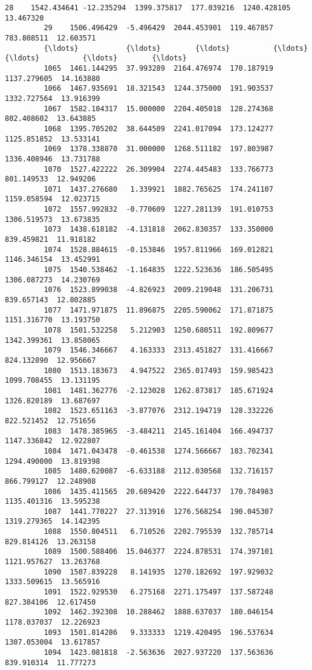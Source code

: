 \documentclass[11pt]{article}
\begin{document}
\begin{Verbatim}[commandchars=\\\{\}]
         28    1542.434641 -12.235294  1399.375817  177.039216  1240.428105  13.467320   
         29    1506.496429  -5.496429  2044.453901  119.467857   783.808511  12.603571   
         {\ldots}           {\ldots}        {\ldots}          {\ldots}         {\ldots}          {\ldots}        {\ldots}   
         1065  1461.144295  37.993289  2164.476974  170.187919  1137.279605  14.163880   
         1066  1467.935691  18.321543  1244.375000  191.903537  1332.727564  13.916399   
         1067  1582.104317  15.000000  2204.405018  128.274368   802.408602  13.643885   
         1068  1395.705202  38.644509  2241.017094  173.124277  1125.851852  13.533141   
         1069  1378.338870  31.000000  1268.511182  197.803987  1336.408946  13.731788   
         1070  1527.422222  26.309904  2274.445483  133.766773   801.149533  12.949206   
         1071  1437.276680   1.339921  1882.765625  174.241107  1159.058594  12.023715   
         1072  1557.992832  -0.770609  1227.281139  191.010753  1306.519573  13.673835   
         1073  1438.618182  -4.131818  2062.830357  133.350000   839.459821  11.918182   
         1074  1528.884615  -0.153846  1957.811966  169.012821  1146.346154  13.452991   
         1075  1540.538462  -1.164835  1222.523636  186.505495  1306.087273  14.230769   
         1076  1523.899038  -4.826923  2009.219048  131.206731   839.657143  12.802885   
         1077  1471.971875  11.896875  2205.590062  171.871875  1151.316770  13.193750   
         1078  1501.532258   5.212903  1250.680511  192.809677  1342.399361  13.858065   
         1079  1546.346667   4.163333  2313.451827  131.416667   824.132890  12.956667   
         1080  1513.183673   4.947522  2365.017493  159.985423  1099.708455  13.131195   
         1081  1481.362776  -2.123028  1262.873817  185.671924  1326.820189  13.687697   
         1082  1523.651163  -3.877076  2312.194719  128.332226   822.521452  12.751656   
         1083  1478.385965  -3.484211  2145.161404  166.494737  1147.336842  12.922807   
         1084  1471.043478  -0.461538  1274.566667  183.702341  1294.490000  13.819398   
         1085  1480.620087  -6.633188  2112.030568  132.716157   866.799127  12.248908   
         1086  1435.411565  20.689420  2222.644737  170.784983  1135.401316  13.595238   
         1087  1441.770227  27.313916  1276.568254  190.045307  1319.279365  14.142395   
         1088  1550.804511   6.710526  2202.795539  132.785714   829.814126  13.263158   
         1089  1500.588406  15.046377  2224.878531  174.397101  1121.957627  13.263768   
         1090  1507.839228   8.141935  1270.182692  197.929032  1333.509615  13.565916   
         1091  1522.929530   6.275168  2271.175497  137.587248   827.384106  12.617450   
         1092  1462.392308  10.288462  1888.637037  180.046154  1178.037037  12.226923   
         1093  1501.814286   9.333333  1219.420495  196.537634  1307.053004  13.617857   
         1094  1423.081818  -2.563636  2027.937220  137.563636   839.910314  11.777273   
         

\end{Verbatim}
\end{document}
